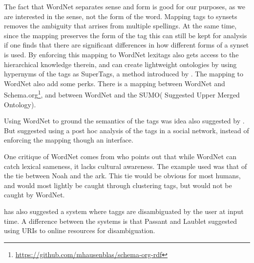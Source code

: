 The fact that WordNet separates sense and form is good for our purposes, as we are interested in the sense, not the form of the word. 
Mapping tags to synsets removes the ambiguity that arrises from multiple spellings. 
At the same time, since the mapping preserves the form of the tag this can still be kept for analysis if one finds that there are significant differences in how different forms of a synset is used\citep{Veres2011}.
By enforcing this mapping to WordNet lexitags also gets access to the hierarchical knowledge therein, and can create lightweight ontologies by using hypernyms of the tags as SuperTags, a method introduced by \citet{Veres2010}.
The mapping to WordNet also add some perks. There is a mapping between WordNet and Schema.org\footnote{\url{https://github.com/mhausenblas/schema-org-rdf}}, and between WordNet and the SUMO( Suggested Upper Merged Ontology)\citep{Niles2003}.

Using WordNet to ground the semantics of the tags was idea also suggested by \cite{Cattuto2008}. But \citet{Cattuto2008} suggested using a post hoc analysis of the tags in a social network, instead of enforcing the mapping though an interface.

One critique of WordNet comes from \citet{Mika2005} who points out that while WordNet can catch lexical sameness, it lacks cultural awareness. The example used was that of the tie between Noah and the ark.
This tie would be obvious for most humans, and would most lightly be caught through clustering tags, but would not be caught by WordNet.

\citet{Passant2008} has also suggested a system where taggs are disambiguated by the user at input time. A difference between the systems is that Passant and Laublet suggested using URIs to online resources for disambiguation.

